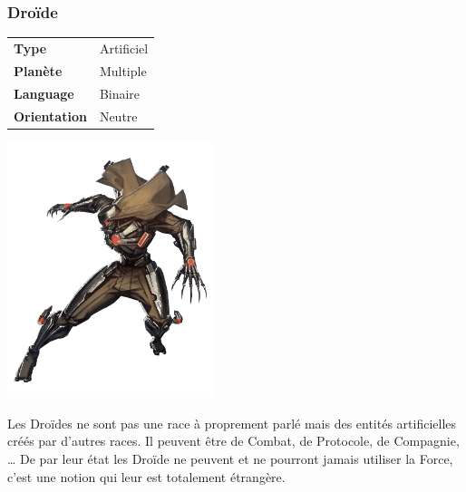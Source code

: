 \subsubsection{Droïde}
\vspace{4\baselineskip}
\begin{tabular}{ l l }
	\textbf{Type} 			& Artificiel \\
   	\textbf{Planète} 		& Multiple \\
   	\textbf{Language} 		& Binaire \\
   	\textbf{Orientation} 	& Neutre \\
\end{tabular}

\vspace{-11\baselineskip}

\begin{flushright}
\includegraphics[width=6cm]{img/races/droide.png}
\end{flushright}
\vspace{-2\baselineskip}

Les Droïdes ne sont pas une race à proprement parlé mais des entités artificielles créés par d'autres races. Il peuvent être de Combat, de Protocole, de Compagnie, \ldots 
De par leur état les Droïde ne peuvent et ne pourront jamais utiliser la Force, c'est une notion qui leur est totalement étrangère.

